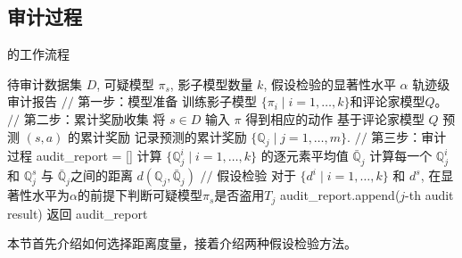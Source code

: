 \subsection{审计过程}
\label{sec:the details of audit process}
\begin{algorithm}[!t]
    \caption{\sysnameo 的工作流程}
    \label{alg:Generation Mechanism 2}
    \begin{algorithmic}[1]
    \REQUIRE 待审计数据集 $D$, 可疑模型 $\pi_s$, 影子模型数量 $k$, 假设检验的显著性水平 $\alpha$
    \ENSURE 轨迹级审计报告
    \STATE $//$ 第一步：模型准备
    \STATE 训练影子模型 $\{\pi_i \mid i=1,\dots,k\}$和评论家模型$Q$。
    \STATE $//$ 第二步：累计奖励收集
    \STATE 将 $s\in D$ 输入 $\pi$ 得到相应的动作
    \STATE 基于评论家模型 $Q$ 预测 $(s, a)$ 的累计奖励
    \STATE 记录预测的累计奖励 $\{\mathbb{Q}_j \mid j=1,\dots,m\}$.
    \ENDFOR
    \STATE $//$ 第三步：审计过程
    \STATE audit\_report = []
    \STATE 计算 $\{\mathbb{Q}_j^i \mid i= 1,\dots, k\}$ 的逐元素平均值 $\bar{\mathbb{Q}}_j$
    \STATE 计算每一个 $\mathbb{Q}_j^i$ 和 $\mathbb{Q}_j^s$ 与 $\bar{\mathbb{Q}}_j$之间的距离 $d(\mathbb{Q}_j, \bar{\mathbb{Q}}_j)$ 
    \STATE $//$ 假设检验
    \STATE 对于 $\{d^i \mid i=1,\dots, k\}$ 和 $d^s$, 在显著性水平为$\alpha$的前提下判断可疑模型$\pi_s$是否盗用$T_j$
    \STATE audit\_report.append($j$-th audit result)
    \ENDFOR
    \STATE 返回 audit\_report
    \end{algorithmic}
\end{algorithm}
本节首先介绍如何选择距离度量，接着介绍两种假设检验方法。

